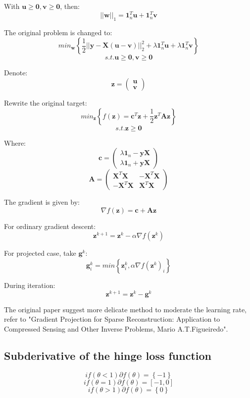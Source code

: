\documentclass[UTF8]{ctexart}
\begin{document}
With $\textbf{u} \geq \textbf{0},\textbf{v} \geq \textbf{0}$, then:
$$||\textbf{w}||_{1} = \textbf{1}_{n}^{T}\textbf{u} + \textbf{1}_{n}^{T}\textbf{v}$$

The original problem is changed to:
$$min_{\textbf{w}}\left\{ \frac{1}{2}||\textbf{y}-\textbf{X}(\textbf{u}-\textbf{v})||^{2}_{2} + \lambda\textbf{1}_{n}^{T}\textbf{u} + \lambda\textbf{1}_{n}^{T}\textbf{v} \right\}$$
$$s.t.\textbf{u} \geq \textbf{0},\textbf{v} \geq \textbf{0}$$

Denote:
$$\textbf{z} = \begin{pmatrix}  \textbf{u} \\ \textbf{v} \end{pmatrix}$$

Rewrite the original target:
$$min_{\textbf{z}}\left\{ f(\textbf{z}) = \textbf{c}^{T}\textbf{z} +\frac{1}{2}\textbf{z}^{T}\textbf{A}\textbf{z} \right\}$$
$$s.t.\textbf{z} \geq \textbf{0}$$

Where:
$$\textbf{c} = \begin{pmatrix} \lambda \textbf{1}_{n} - \textbf{y}\textbf{X} \\ \lambda\textbf{1}_{n} + \textbf{y}\textbf{X} \end{pmatrix}$$
$$\textbf{A}=\begin{pmatrix} \textbf{X}^{T}\textbf{X} & -\textbf{X}^{T}\textbf{X} \\ -\textbf{X}^{T}\textbf{X} & \textbf{X}^{T}\textbf{X} \end{pmatrix}$$

The gradient is given by:
$$\nabla f(\textbf{z})=\textbf{c}+\textbf{A}\textbf{z}$$

For ordinary gradient descent:
$$\textbf{z}^{k+1}=\textbf{z}^{k}-\alpha\nabla f(\textbf{z}^{k})$$

For projected case, take $\textbf{g}^{k}$:
$$\textbf{g}^{k}_{i}=min\left\{ \textbf{z}^{k}_{i},\alpha\nabla f(\textbf{z}^{k})_{i} \right\}$$

During iteration:
$$\textbf{z}^{k+1}=\textbf{z}^{k} - \textbf{g}^{k}$$

The original paper suggest more delicate method to moderate the learning rate, refer to "Gradient Projection for Sparse Reconstruction: Application to Compressed Sensing and Other Inverse Problems, Mario A.T.Figueiredo".

\subsection{Subderivative of the hinge loss function}
$$if(\theta < 1) \partial f(\theta)=\left\{ -1 \right\}$$
$$if(\theta = 1) \partial f(\theta)=[ -1,0 ]$$
$$if(\theta > 1) \partial f(\theta)=\left\{ 0 \right\}$$
\end{document}
